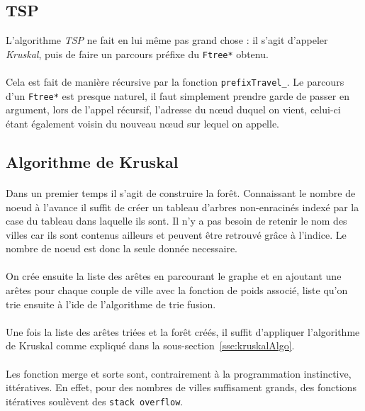 \documentclass[a4paper]{article}
\begin{document}
\subsection{TSP}
L'algorithme \emph{TSP} ne fait en lui même pas grand chose : il s'agit d'appeler \emph{Kruskal}, puis de faire un parcours préfixe du \texttt{Ftree*} obtenu.

\paragraph*{}
Cela est fait de manière récursive par la fonction \texttt{prefixTravel\_}. Le parcours d'un \texttt{Ftree*} est presque naturel, il faut simplement prendre garde de passer en argument, lors de l'appel récursif, l'adresse du nœud duquel on vient, celui-ci étant également voisin du nouveau nœud sur lequel on appelle.

\subsection{Algorithme de Kruskal}

\paragraph*{}
Dans un premier temps il s'agit de construire la forêt. Connaissant le nombre de noeud à l'avance il suffit de créer un tableau d'arbres non-enracinés indexé par la case du tableau dans laquelle ils sont. Il n'y a pas besoin de retenir le nom des villes car ils sont contenus ailleurs et peuvent être retrouvé grâce à l'indice. Le nombre de noeud est donc la seule donnée necessaire.
\paragraph*{}
On crée ensuite la liste des arêtes en parcourant le graphe et en ajoutant une arêtes pour chaque couple de ville avec la fonction de poids associé, liste qu'on trie ensuite à l'ide de l'algorithme de trie fusion.
\paragraph*{}
Une fois la liste des arêtes triées et la forêt créés, il suffit d'appliquer l'algorithme de Kruskal comme expliqué dans la sous-section~\ref{sse:kruskalAlgo}.
\paragraph*{}
Les fonction merge et sorte sont, contrairement à la programmation instinctive, ittératives. En effet, pour des nombres de villes suffisament grands, des fonctions itératives soulèvent des \texttt{stack overflow}.
\end{document}
